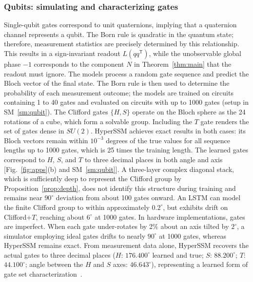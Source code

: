 \documentclass[aps,prx,reprint,superscriptaddress,longbibliography,nofootinbib,floatfix]{revtex4-2}
\theoremstyle{plain}
\theoremstyle{definition}
\begin{document}
\subsubsection{Qubits: simulating and characterizing gates}
Single-qubit gates correspond to unit quaternions, implying that a quaternion channel represents a qubit. The Born rule is quadratic in the quantum state; therefore, measurement statistics are precisely determined by this relationship. This results in a sign-invariant readout $L(qq^{\mathsf T})$, while the unobservable global phase $-1$ corresponds to the component $N$ in Theorem~\ref{thm:main} that the readout must
ignore. The models process a random gate sequence and predict the Bloch vector of
the final state. The Born rule is then used to determine the probability of each measurement outcome; the models are trained on circuits containing 1 to 40 gates and evaluated on circuits with up to 1000 gates (setup in SM~\ref{sm:qubit}). The Clifford gates $\{H,S\}$ operate on the Bloch sphere as
the 24 rotations of a cube, which form a solvable group. Including the $T$ gate renders the set of gates dense in $SU(2)$. HyperSSM achieves exact results in both cases: its Bloch vectors remain within
$10^{-3}$ degrees of the true values for all sequence lengths up to 1000 gates, which is 25 times the training length. The learned gates correspond to $H$, $S$, and $T$ to three decimal places in both angle and axis [Fig.~\ref{fig:apps}(b) and SM~\ref{sm:qubit}]. A three-layer
complex diagonal stack, which is sufficiently deep to represent the Clifford group by Proposition~\ref{prop:depth}, does not identify this structure during training and remains near $90^\circ$ deviation from about 100 gates onward. An LSTM can model the finite Clifford group
to within approximately $0.2^\circ$, but exhibits drift on Clifford+$T$, reaching about $6^\circ$ at 1000 gates. In hardware implementations, gates are imperfect. When each gate under-rotates by 2\% about an axis tilted by $2^\circ$, a simulator employing ideal gates drifts to nearly $90^\circ$ at 1000 gates, whereas HyperSSM remains exact. From measurement data alone, HyperSSM recovers the actual gates to three decimal places ($H$: $176.400^\circ$ learned and true; $S$: $88.200^\circ$; $T$: $44.100^\circ$; angle between the $H$ and $S$ axes: $46.643^\circ$), representing a learned form of gate set characterization~\cite{nielsen_gst}.
\end{document}
